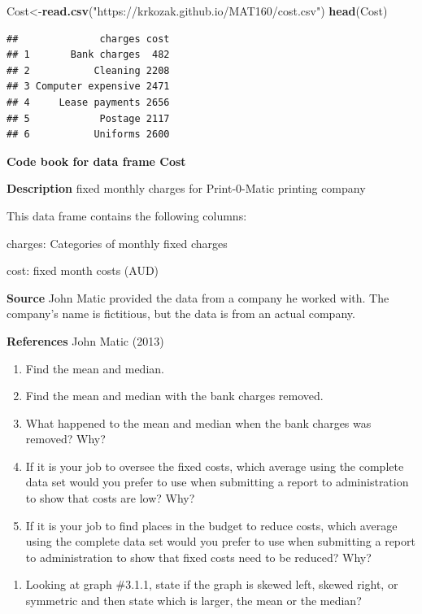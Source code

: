 \documentclass[]{book}
\newenvironment{Shaded}{\begin{snugshade}}{\end{snugshade}}
\newcommand{\KeywordTok}[1]{\textcolor[rgb]{0.13,0.29,0.53}{\textbf{#1}}}
\newcommand{\NormalTok}[1]{#1}
\newcommand{\StringTok}[1]{\textcolor[rgb]{0.31,0.60,0.02}{#1}}
\providecommand{\tightlist}{%
  \setlength{\itemsep}{0pt}\setlength{\parskip}{0pt}}
\begin{document}
\begin{Shaded}
\begin{Highlighting}[]
\NormalTok{Cost<-}\KeywordTok{read.csv}\NormalTok{(}\StringTok{"https://krkozak.github.io/MAT160/cost.csv"}\NormalTok{)}
\KeywordTok{head}\NormalTok{(Cost)}
\end{Highlighting}
\end{Shaded}

\begin{verbatim}
##              charges cost
## 1       Bank charges  482
## 2           Cleaning 2208
## 3 Computer expensive 2471
## 4     Lease payments 2656
## 5            Postage 2117
## 6           Uniforms 2600
\end{verbatim}

\textbf{Code book for data frame Cost}

\textbf{Description}
fixed monthly charges for Print-0-Matic printing company

This data frame contains the following columns:

charges: Categories of monthly fixed charges

cost: fixed month costs (AUD)

\textbf{Source}
John Matic provided the data from a company he worked with. The company's name is fictitious, but the data is from an actual company.

\textbf{References}
John Matic (2013)

\begin{enumerate}
\def\labelenumi{\alph{enumi}.}
\item
  Find the mean and median.
\item
  Find the mean and median with the bank charges removed.
\item
  What happened to the mean and median when the bank charges was removed? Why?
\item
  If it is your job to oversee the fixed costs, which average using the complete data set would you prefer to use when submitting a report to administration to show that costs are low? Why?
\item
  If it is your job to find places in the budget to reduce costs, which average using the complete data set would you prefer to use when submitting a report to administration to show that fixed costs need to be reduced? Why?
\end{enumerate}

\begin{enumerate}
\def\labelenumi{\arabic{enumi}.}
\setcounter{enumi}{4}
\tightlist
\item
  Looking at graph \#3.1.1, state if the graph is skewed left, skewed right, or symmetric and then state which is larger, the mean or the median?
\end{enumerate}
\end{document}
